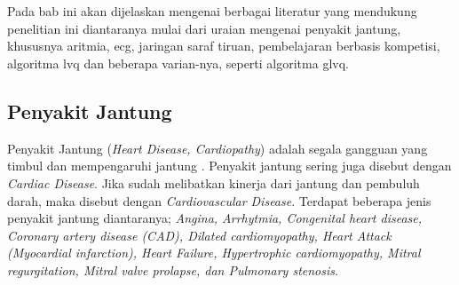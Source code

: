\chapter{\babDua}
Pada bab ini akan dijelaskan mengenai berbagai literatur yang mendukung
penelitian ini diantaranya mulai dari uraian mengenai penyakit jantung,
khususnya aritmia, \gls{ecg}, jaringan saraf tiruan, pembelajaran
berbasis kompetisi, algoritma \gls{lvq} dan beberapa varian-nya, seperti
algoritma \gls{glvq}.

\section{Penyakit Jantung}
\label{sec:jantung}
Penyakit Jantung (\textit{Heart Disease, Cardiopathy}) adalah segala gangguan
yang timbul dan mempengaruhi jantung \cite{medicinenet.1}. Penyakit jantung
sering juga disebut dengan \textit{Cardiac Disease}. Jika sudah melibatkan
kinerja dari jantung dan pembuluh darah, maka disebut dengan
\textit{Cardiovascular Disease}. Terdapat beberapa jenis penyakit jantung
diantaranya; \emph{Angina, Arrhytmia, Congenital heart disease, Coronary artery
disease (CAD), Dilated cardiomyopathy, Heart Attack (Myocardial infarction),
Heart Failure, Hypertrophic cardiomyopathy, Mitral regurgitation, Mitral valve
prolapse, dan Pulmonary stenosis}. 

